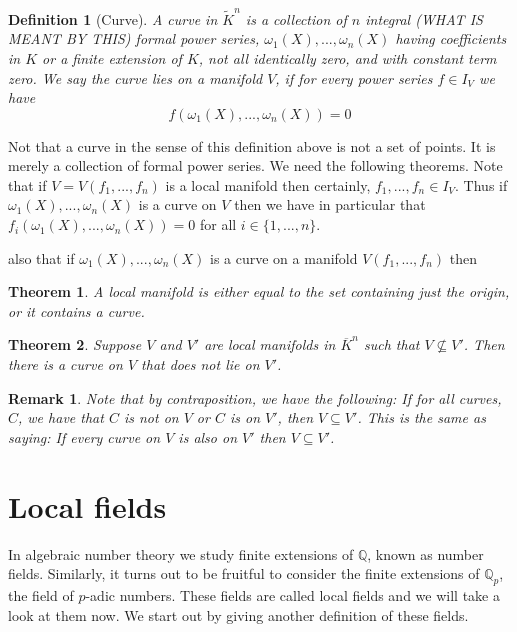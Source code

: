 \documentclass{article}
\newtheorem{theorem}{Theorem}[section]
\newtheorem{definition}{Definition}[section]
\newtheorem{remark}{Remark}[section]
\newcommand{\mbb}[1]{\mathbb{#1}}
\begin{document}


\begin{definition}[Curve]
    A curve in $\tilde{K}^n$ is a collection of $n$ integral (WHAT IS MEANT BY THIS) formal power series, $\omega_1(X), ..., \omega_n(X)$ having coefficients in $K$ or a finite extension of $K$, not all identically zero, and with constant term zero. We say the curve lies on a manifold $V$, if for every power series $f \in I_V$ we have $$f(\omega_1(X), ..., \omega_n(X)) = 0$$
\end{definition}
Not that a curve in the sense of this definition above is not a set of points. It is merely a collection of formal power series. We need the following theorems. Note that if $V = V(f_1, ..., f_n)$ is a local manifold then certainly, $f_1, ..., f_n \in I_V$. Thus if $\omega_1(X), ..., \omega_n(X)$ is a curve on $V$ then we have in particular that $f_i(\omega_1(X), ..., \omega_n(X)) = 0$ for all $i \in \{1, ..., n\}$. 

also that if $\omega_1(X), ..., \omega_n(X)$ is a curve on a manifold $V(f_1, ..., f_n)$ then 
\begin{theorem}\label{thm: The shape of a manifold}
    A local manifold is either equal to the set containing just the origin, or it contains a curve.
\end{theorem}

\begin{theorem}\label{thm: One manifold is contained in another}
    Suppose $V$ and $V'$ are local manifolds in $\overline K^n$ such that $V \nsubseteq V'$. Then there is a curve on $V$ that does not lie on $V'$.
\end{theorem}
\begin{remark}\label{remark: One manifold is contained in another}
    Note that by contraposition, we have the following: If for all curves, $C$, we have that $C$ is not on $V$ or $C$ is on $V'$, then $V \subseteq V'$. This is the same as saying: If every curve on $V$ is also on $V'$ then $V \subseteq V'$.
\end{remark}


\section{Local fields}
In algebraic number theory we study finite extensions of $\mbb Q$, known as number fields. Similarly, it turns out to be fruitful to consider the finite extensions of $\mbb Q_p$, the field of $p$-adic numbers. These fields are called local fields and we will take a look at them now. We start out by giving another definition of these fields.
\end{document}
